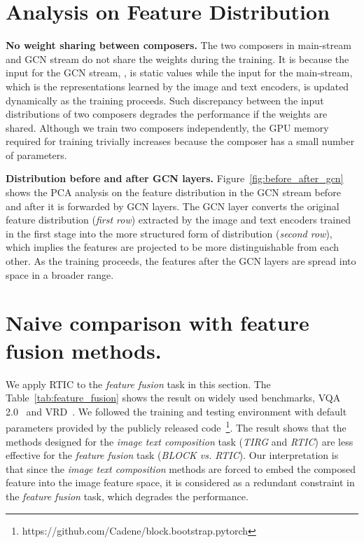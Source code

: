 \documentclass[10pt,twocolumn,letterpaper]{article}
\begin{document}
\section{Analysis on Feature Distribution}
\noindent
\textbf{No weight sharing between composers.} The two composers in main-stream and GCN stream do not share the weights during the training. It is because the input for the GCN stream, , is static values while the input for the main-stream, which is the representations learned by the image and text encoders, is updated dynamically as the training proceeds. Such discrepancy between the input distributions of two composers degrades the performance if the weights are shared. Although we train two composers independently, the GPU memory required for training trivially increases because the composer has a small number of parameters.

\noindent
\textbf{Distribution before and after GCN layers.} Figure~\ref{fig:before_after_gcn} shows the PCA analysis on the feature distribution in the GCN stream before and after it is forwarded by GCN layers. The GCN layer converts the original feature distribution (\textit{first row}) extracted by the image and text encoders trained in the first stage into the more structured form of distribution (\textit{second row}), which implies the features are projected to be more distinguishable from each other. As the training proceeds, the features after the GCN layers are spread into space in a broader range.


\section{Naive comparison with feature fusion methods.}
We apply RTIC to the \textit{feature fusion} task in this section. The Table~\ref{tab:feature_fusion} shows the result on widely used benchmarks, VQA 2.0~\cite{goyal2017making} and VRD~\cite{lu2016visual}. We followed the training and testing environment with default parameters provided by the publicly released code~\footnote{https://github.com/Cadene/block.bootstrap.pytorch}. The result shows that the methods designed for the \textit{image text composition} task (\textit{TIRG} and \textit{RTIC}) are less effective for the \textit{feature fusion} task (\textit{BLOCK vs. RTIC}). Our interpretation is that since the \textit{image text composition} methods are forced to embed the composed feature into the image feature space, it is considered as a redundant constraint in the \textit{feature fusion} task, which degrades the performance.
\end{document}
